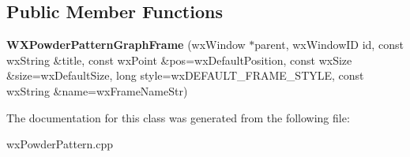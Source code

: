 \subsection*{Public Member Functions}
\begin{DoxyCompactItemize}
\item 
\mbox{\label{class_obj_cryst_1_1_w_x_powder_pattern_graph_frame_abd13bb93e031a5a4130d949251e44687}} 
{\bfseries W\+X\+Powder\+Pattern\+Graph\+Frame} (wx\+Window $\ast$parent, wx\+Window\+ID id, const wx\+String \&title, const wx\+Point \&pos=wx\+Default\+Position, const wx\+Size \&size=wx\+Default\+Size, long style=wx\+D\+E\+F\+A\+U\+L\+T\+\_\+\+F\+R\+A\+M\+E\+\_\+\+S\+T\+Y\+LE, const wx\+String \&name=wx\+Frame\+Name\+Str)
\end{DoxyCompactItemize}


The documentation for this class was generated from the following file\+:\begin{DoxyCompactItemize}
\item 
wx\+Powder\+Pattern.\+cpp\end{DoxyCompactItemize}
